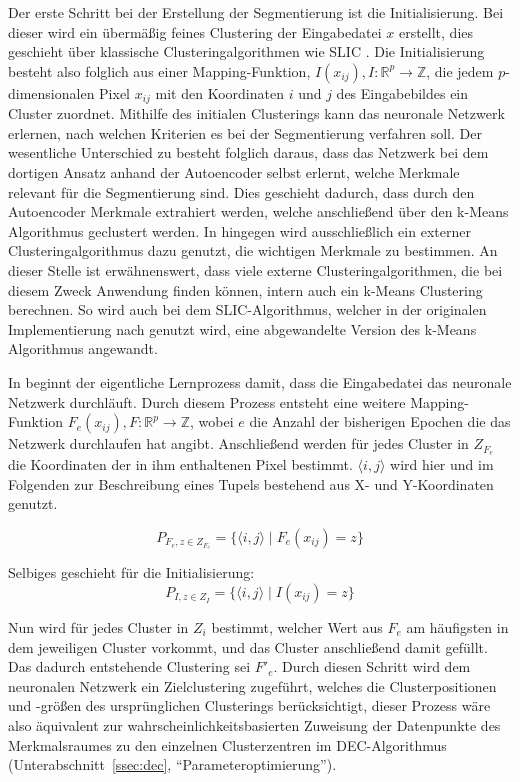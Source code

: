 Der erste Schritt bei der Erstellung der Segmentierung ist die Initialisierung. Bei dieser wird ein übermäßig feines Clustering der Eingabedatei $x$ erstellt, dies geschieht über klassische Clusteringalgorithmen wie SLIC \cite{achanta_10}. Die Initialisierung besteht also folglich aus einer Mapping-Funktion, $I(x_{ij}), I: \mathbb{R}^p\rightarrow\mathbb{Z}$, die jedem $p$-dimensionalen Pixel $x_{ij}$ mit den Koordinaten $i$ und $j$ des Eingabebildes ein Cluster zuordnet. Mithilfe des initialen Clusterings kann das neuronale Netzwerk erlernen, nach welchen Kriterien es bei der Segmentierung verfahren soll.
Der wesentliche Unterschied zu \cite{junyuan_16} besteht folglich daraus, dass das Netzwerk bei dem dortigen Ansatz anhand der Autoencoder selbst erlernt, welche Merkmale relevant für die Segmentierung sind. Dies geschieht dadurch, dass durch den Autoencoder Merkmale extrahiert werden, welche anschließend über den k-Means Algorithmus geclustert werden. In \cite{kanezaki_18} hingegen wird ausschließlich ein externer Clusteringalgorithmus dazu genutzt, die wichtigen Merkmale zu bestimmen. An dieser Stelle ist erwähnenswert, dass viele externe Clusteringalgorithmen, die bei diesem Zweck Anwendung finden können, intern auch ein k-Means Clustering berechnen. So wird auch bei dem SLIC-Algorithmus, welcher in der originalen Implementierung nach \cite{kanezaki_18} genutzt wird, eine abgewandelte Version des k-Means Algorithmus angewandt. \cite{achanta_10}

In \cite{kanezaki_18} beginnt der eigentliche Lernprozess damit, dass die Eingabedatei das neuronale Netzwerk durchläuft. Durch diesem Prozess entsteht eine weitere Mapping-Funktion $F_e(x_{ij}), F: \mathbb{R}^p\rightarrow\mathbb{Z}$, wobei $e$ die Anzahl der bisherigen Epochen die das Netzwerk durchlaufen hat angibt. Anschließend werden für jedes Cluster in $Z_{F_e}$  die Koordinaten der in ihm enthaltenen Pixel bestimmt. $\langle i, j\rangle$ wird hier und im Folgenden zur Beschreibung eines Tupels bestehend aus X- und Y-Koordinaten genutzt.

\begin{equation}
P_{F_e,{z\in Z_{F_e}}} = \{\langle i, j\rangle\mid F_e(x_{ij}) = z\}
\end{equation}

Selbiges geschieht für die Initialisierung:
\begin{equation}
P_{I, z\in Z_I} = \{\langle i, j\rangle\mid I(x_{ij}) = z\}
\end{equation}

Nun wird für jedes Cluster in $Z_i$ bestimmt, welcher Wert aus $F_{e}$ am häufigsten in dem jeweiligen Cluster vorkommt, und das Cluster anschließend damit gefüllt. Das dadurch entstehende Clustering sei $F'_e$. Durch diesen Schritt wird dem neuronalen Netzwerk ein Zielclustering zugeführt, welches die Clusterpositionen und -größen des ursprünglichen Clusterings berücksichtigt, dieser Prozess wäre also äquivalent zur wahrscheinlichkeitsbasierten Zuweisung der Datenpunkte des Merkmalsraumes zu den einzelnen Clusterzentren im DEC-Algorithmus (\vgl Unterabschnitt~\ref{ssec:dec}, \enquote{Parameteroptimierung}).

